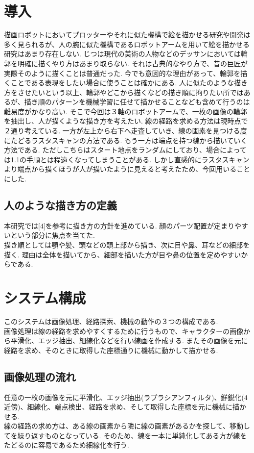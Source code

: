 \documentclass[a4j]{jarticle}			%
\begin{document}
\begin{multicols}{2} %

\section{導入}
描画ロボットにおいてプロッターやそれに似た機構で絵を描かせる研究や開発は多く見られるが、人の腕に似た機構であるロボットアームを用いて絵を描かせる研究はあまり存在しない.
じつは現代の美術の人物などのデッサンにおいては輪郭を明確に描くやり方はあまり取らない.
それは古典的なやり方で、昔の巨匠が実際そのように描くことは普通だった.
今でも意図的な理由があって、輪郭を描くことである表現をしたい場合に使うことは確かにある.
人に似たのような描き方をさせたいという以上、輪郭やどこから描くなどの描き順に拘りたい所ではあるが、描き順のパターンを機械学習に任せて描かせることなども含めて行うのは難易度がかなり高い.
そこで今回は３軸のロボットアームで、一枚の画像の輪郭を抽出し、人が描くような描き方を考えたい.
線の経路を求める方法は現時点で２通り考えている. 
一方が左上から右下へ走査していき、線の画素を見つける度にたどるラスタスキャンの方法である. 
もう一方は端点を持つ線から描いていく方法である.
ただしこちらはスタート地点をランダムにしており、場合によっては1.1の手順とは程遠くなってしまうことがある. 
しかし直感的にラスタスキャンより端点から描くほうが人が描いたように見えると考えたため、今回用いることにした.

\subsection{人のような描き方の定義}
本研究では$\lbrack4\rbrack$を参考に描き方の方針を進めている.
顔のパーツ配置が定まりやすいという部分に焦点を当てた.\\
描き順としては顎や髪、頭などの頭上部から描き、次に目や鼻、耳などの細部を描く.
理由は全体を描いてから、細部を描いた方が目や鼻の位置を定めやすいからである.

\section{システム構成}
このシステムは画像処理、経路探索、機械の動作の３つの構成である.\\
画像処理は線の経路を求めやすくするために行うもので、キャラクターの画像から平滑化、エッジ抽出、細線化などを行い線画を作成する. 
またその画像を元に経路を求め、そのときに取得した座標通りに機械に動かして描かせる.\\ 

\subsection{画像処理の流れ}
任意の一枚の画像を元に平滑化、エッジ抽出(ラプラシアンフィルタ)、鮮鋭化(4近傍)、細線化、端点検出、経路を求め、そして取得した座標を元に機械に描かせる.\\ 
線の経路の求め方は、ある線の画素から隣に線の画素があるかを探して、移動してを繰り返すものとなっている.
そのため、線を一本に単純化してある方が線をたどるのに容易であるため細線化を行う.


\end{multicols}
\end{document}
